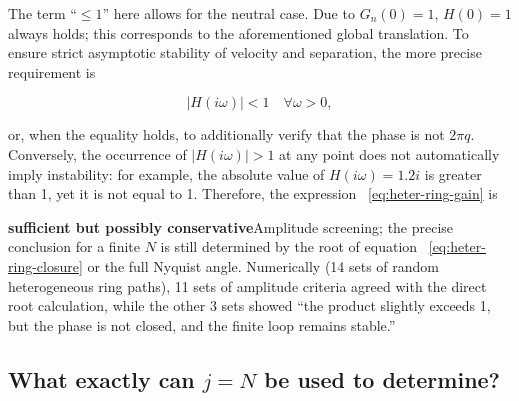 \documentclass[11pt,a4paper,openany]{book}
\numberwithin{equation}{chapter}
\numberwithin{figure}{chapter}
\numberwithin{table}{chapter}
\begin{document}
The term “$\le1$” here allows for the neutral case. Due to $G_n(0)=1$, $H(0)=1$ always holds; this corresponds to the aforementioned global translation. To ensure strict asymptotic stability of velocity and separation, the more precise requirement is

\[
|H(i\omega)|<1\quad \forall\omega>0,
\]

or, when the equality holds, to additionally verify that the phase is not $2\pi q$. Conversely, the occurrence of $|H(i\omega)|>1$ at any point does not automatically imply instability: for example, the absolute value of $H(i\omega)=1.2i$ is greater than 1, yet it is not equal to 1. Therefore, the expression ~\eqref{eq:heter-ring-gain} is




\textbf{sufficient but possibly conservative}Amplitude screening; the precise conclusion for a finite $N$ is still determined by the root of equation ~\eqref{eq:heter-ring-closure} or the full Nyquist angle. Numerically (14 sets of random heterogeneous ring paths), 11 sets of amplitude criteria agreed with the direct root calculation, while the other 3 sets showed “the product slightly exceeds 1, but the phase is not closed, and the finite loop remains stable.”










\subsection{What exactly can $j=N$ be used to determine?}
\end{document}

